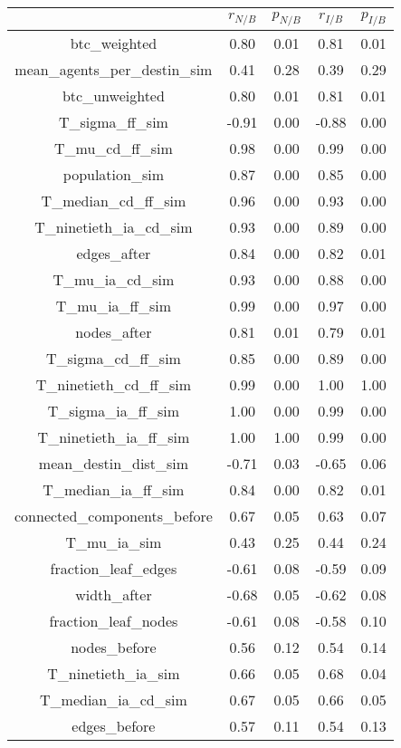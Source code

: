 \begin{tabular}{c|cccc}
& $r_{N/B}$ & $p_{N/B}$ & $r_{I/B}$ & $p_{I/B}$ \\
\hline
btc\_weighted & 0.80 & 0.01 & 0.81 & 0.01 \\
mean\_agents\_per\_destin\_sim & 0.41 & 0.28 & 0.39 & 0.29 \\
btc\_unweighted & 0.80 & 0.01 & 0.81 & 0.01 \\
T\_sigma\_ff\_sim & -0.91 & 0.00 & -0.88 & 0.00 \\
T\_mu\_cd\_ff\_sim & 0.98 & 0.00 & 0.99 & 0.00 \\
population\_sim & 0.87 & 0.00 & 0.85 & 0.00 \\
T\_median\_cd\_ff\_sim & 0.96 & 0.00 & 0.93 & 0.00 \\
T\_ninetieth\_ia\_cd\_sim & 0.93 & 0.00 & 0.89 & 0.00 \\
edges\_after & 0.84 & 0.00 & 0.82 & 0.01 \\
T\_mu\_ia\_cd\_sim & 0.93 & 0.00 & 0.88 & 0.00 \\
T\_mu\_ia\_ff\_sim & 0.99 & 0.00 & 0.97 & 0.00 \\
nodes\_after & 0.81 & 0.01 & 0.79 & 0.01 \\
T\_sigma\_cd\_ff\_sim & 0.85 & 0.00 & 0.89 & 0.00 \\
T\_ninetieth\_cd\_ff\_sim & 0.99 & 0.00 & 1.00 & 1.00 \\
T\_sigma\_ia\_ff\_sim & 1.00 & 0.00 & 0.99 & 0.00 \\
T\_ninetieth\_ia\_ff\_sim & 1.00 & 1.00 & 0.99 & 0.00 \\
mean\_destin\_dist\_sim & -0.71 & 0.03 & -0.65 & 0.06 \\
T\_median\_ia\_ff\_sim & 0.84 & 0.00 & 0.82 & 0.01 \\
connected\_components\_before & 0.67 & 0.05 & 0.63 & 0.07 \\
T\_mu\_ia\_sim & 0.43 & 0.25 & 0.44 & 0.24 \\
fraction\_leaf\_edges & -0.61 & 0.08 & -0.59 & 0.09 \\
width\_after & -0.68 & 0.05 & -0.62 & 0.08 \\
fraction\_leaf\_nodes & -0.61 & 0.08 & -0.58 & 0.10 \\
nodes\_before & 0.56 & 0.12 & 0.54 & 0.14 \\
T\_ninetieth\_ia\_sim & 0.66 & 0.05 & 0.68 & 0.04 \\
T\_median\_ia\_cd\_sim & 0.67 & 0.05 & 0.66 & 0.05 \\
edges\_before & 0.57 & 0.11 & 0.54 & 0.13 \\

\end{tabular}
